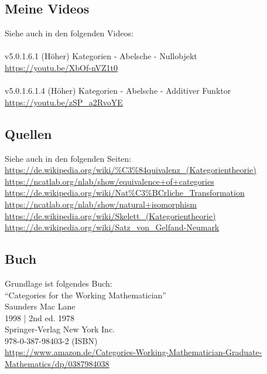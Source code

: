 \documentclass[a4paper]{amsart}
\theoremstyle{definition}
\begin{document}
\subsection*{Meine Videos}
Siehe auch in den folgenden Videos:\\ 
\\
v5.0.1.6.1 (Höher) Kategorien - Abelsche - Nullobjekt\\
\url{https://youtu.be/XbOf-nVZ1t0}\\
\\
v5.0.1.6.1.4 (Höher) Kategorien - Abelsche - Additiver Funktor\\
\url{https://youtu.be/zSP_a2RvoYE}

\subsection*{Quellen}
Siehe auch in den folgenden Seiten:\\
\url{https://de.wikipedia.org/wiki/%C3%84quivalenz_(Kategorientheorie)}\\
\url{https://ncatlab.org/nlab/show/equivalence+of+categories}\\
\url{https://de.wikipedia.org/wiki/Nat%C3%BCrliche_Transformation}\\
\url{https://ncatlab.org/nlab/show/natural+isomorphism}\\
\url{https://de.wikipedia.org/wiki/Skelett_(Kategorientheorie)}\\
\url{https://de.wikipedia.org/wiki/Satz_von_Gelfand-Neumark}

\subsection*{Buch}
Grundlage ist folgendes Buch:\\
"`Categories for the Working Mathematician"'\\
Saunders Mac Lane\\
1998 | 2nd ed. 1978\\
Springer-Verlag New York Inc.\\
978-0-387-98403-2 (ISBN)\\
{\tiny
   \url{https://www.amazon.de/Categories-Working-Mathematician-Graduate-Mathematics/dp/0387984038}}\\
\end{document}

